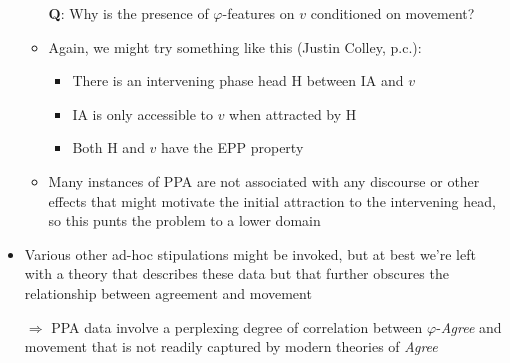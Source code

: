 \documentclass[letterpaper,10pt]{handout_nick}
\begin{document}
\begin{itemize}
\begin{itemize}
\item[{\bf Q}:] Why is the presence of $\varphi$-features on $v$ conditioned on movement?
\item Again, we might try something like this (Justin Colley, p.c.):
\begin{itemize}
\item There is an intervening phase head H between IA and $v$ 
\item IA is only accessible to $v$ when attracted by H
\item Both H and $v$ have the EPP property
\end{itemize}
\item Many instances of PPA are not associated with any discourse or other effects that might motivate the initial attraction to the intervening head, so this punts the problem to a lower domain
\end{itemize}
\item Various other ad-hoc stipulations might be invoked, but at best we're left with a theory that describes these data but that further obscures the relationship between agreement and movement 
\item[$\Rightarrow$] PPA data involve a perplexing degree of correlation between $\varphi$-\emph{Agree} and movement that is not readily captured by modern theories of \emph{Agree} 
\end{itemize}
\end{document}
